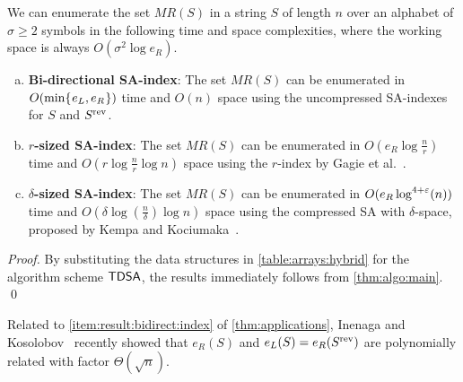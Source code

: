 \begin{theoremrep}\label{thm:applications}
  We can enumerate the set $MR(S)$
  in a string $S$ of length $n$ over an alphabet of $\sigma\ge 2$ symbols in the following time and space complexities, where the working space is always $O(\sigma^2 \log e_R)$. 
\newcommand{\mylistheading}{\textbf}
  \begin{enumerate}[(a)]

\item \mylistheading{Bi-directional SA-index}:    
  The set $MR(S)$ can be enumerated in $O(\min\{\kern0.05eme_L, e_R\kern0.05em\})$ time and $O(n)$ space using the uncompressed SA-indexes for $S$ and $S^{\mathrm{rev}}$. 
  \label{item:result:bidirect:index}
    
  \item \mylistheading{$r$-sized SA-index}:
    The set $MR(S)$  can be enumerated in $O(e_R \log {\frac n r})$ time and $O(r\log {\frac n r}\log n)$ space using the $r$-index by
    Gagie et al.~\cite{gagie:navarro:prezza2020fully}.
      \label{item:result:compressed:r:index}    
    
  \item \mylistheading{$\delta$-sized SA-index}:
    The set $MR(S)$ can be enumerated in $O(e_R \log^{4+\varepsilon}(n))$ time and $O(\delta\log({\frac n \delta}) \log n)$ space using the compressed SA with $\delta$-space, proposed by Kempa and Kociumaka~\cite{kempa:kociumaka2023collapsing}.
          \label{item:result:compressed:delta:index}
  \end{enumerate}
\end{theoremrep}

\begin{proof}
By substituting the data structures in \cref{table:arrays:hybrid} for the algorithm scheme $\textsf{TDSA}$, the results immediately follows from \cref{thm:algo:main}. \qed
\end{proof}

Related to \ref{item:result:bidirect:index} of \cref{thm:applications}, Inenaga and Kosolobov~\cite{inenaga:kosolobov2024relating:left:right} recently showed that $e_R(S)$ and $e_L(S)= e_R(S^{\mathrm{rev}})$ are polynomially related with factor $\Theta(\sqrt{n})$. 




